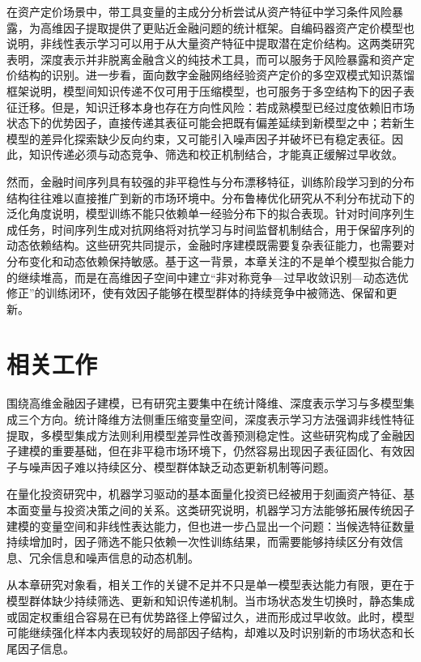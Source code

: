 在资产定价场景中，带工具变量的主成分分析尝试从资产特征中学习条件风险暴露，为高维因子提取提供了更贴近金融问题的统计框架\cite{kelly2020instrumented}。自编码器资产定价模型也说明，非线性表示学习可以用于从大量资产特征中提取潜在定价结构\cite{gu2021autoencoder}。这两类研究表明，深度表示并非脱离金融含义的纯技术工具，而可以服务于风险暴露和资产定价结构的识别。进一步看，面向数字金融网络经验资产定价的多空双模式知识蒸馏框架说明，模型间知识传递不仅可用于压缩模型，也可服务于多空结构下的因子表征迁移\cite{yi2024longshort}。但是，知识迁移本身也存在方向性风险：若成熟模型已经过度依赖旧市场状态下的优势因子，直接传递其表征可能会把既有偏差延续到新模型之中；若新生模型的差异化探索缺少反向约束，又可能引入噪声因子并破坏已有稳定表征。因此，知识传递必须与动态竞争、筛选和校正机制结合，才能真正缓解过早收敛。

然而，金融时间序列具有较强的非平稳性与分布漂移特征，训练阶段学习到的分布结构往往难以直接推广到新的市场环境中。分布鲁棒优化研究从不利分布扰动下的泛化角度说明，模型训练不能只依赖单一经验分布下的拟合表现\cite{sagawa2020distributionally}。针对时间序列生成任务，时间序列生成对抗网络将对抗学习与时间监督机制结合，用于保留序列的动态依赖结构\cite{yoon2019time}。这些研究共同提示，金融时序建模既需要复杂表征能力，也需要对分布变化和动态依赖保持敏感。基于这一背景，本章关注的不是单个模型拟合能力的继续堆高，而是在高维因子空间中建立“非对称竞争—过早收敛识别—动态选优修正”的训练闭环，使有效因子能够在模型群体的持续竞争中被筛选、保留和更新。


\section{相关工作}
围绕高维金融因子建模，已有研究主要集中在统计降维、深度表示学习与多模型集成三个方向。统计降维方法侧重压缩变量空间，深度表示学习方法强调非线性特征提取，多模型集成方法则利用模型差异性改善预测稳定性。这些研究构成了金融因子建模的重要基础，但在非平稳市场环境下，仍然容易出现因子表征固化、有效因子与噪声因子难以持续区分、模型群体缺乏动态更新机制等问题。

在量化投资研究中，机器学习驱动的基本面量化投资已经被用于刻画资产特征、基本面变量与投资决策之间的关系\cite{li2019machine}。这类研究说明，机器学习方法能够拓展传统因子建模的变量空间和非线性表达能力，但也进一步凸显出一个问题：当候选特征数量持续增加时，因子筛选不能只依赖一次性训练结果，而需要能够持续区分有效信息、冗余信息和噪声信息的动态机制。

从本章研究对象看，相关工作的关键不足并不只是单一模型表达能力有限，更在于模型群体缺少持续筛选、更新和知识传递机制。当市场状态发生切换时，静态集成或固定权重组合容易在已有优势路径上停留过久，进而形成过早收敛。此时，模型可能继续强化样本内表现较好的局部因子结构，却难以及时识别新的市场状态和长尾因子信息。


